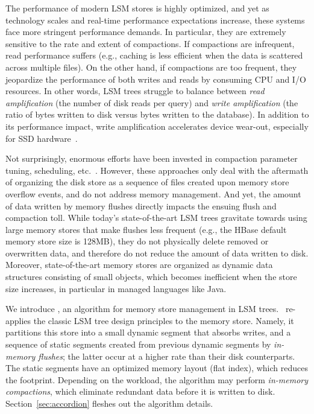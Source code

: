 The performance of modern LSM stores is highly optimized, and yet as technology scales and real-time 
performance expectations increase, these systems face more stringent performance demands. In particular, 
they are extremely sensitive to the rate and extent of compactions. If compactions are infrequent, read performance
suffers (e.g., caching is less efficient when the data is scattered across multiple files). On the other hand, if 
compactions are too frequent, they jeopardize the performance of both writes and reads by consuming CPU 
and I/O resources. In other words, LSM trees struggle to balance between {\em read amplification} (the number 
of disk reads per query) and {\em write amplification} (the ratio of bytes written to disk versus bytes written to the 
database). In addition to its performance impact, write amplification accelerates device wear-out, especially for SSD 
hardware~\cite{Hu:2009}. 

Not surprisingly, enormous efforts have been invested in compaction parameter tuning, scheduling, etc.~\cite{hbasetuning,
universalcompaction,scylladbcompaction,Sears:2012}. However, these approaches only deal with the aftermath
of organizing the disk store as a sequence of files created upon memory store overflow events, and do not 
address memory management. And yet, the amount of data written by memory flushes  
directly impacts the ensuing flush and compaction toll. 
While today's state-of-the-art LSM trees gravitate towards using large memory 
stores that make flushes less frequent (e.g., the HBase default memory store size is 128MB), 
they do not physically delete removed or overwritten data,
and therefore do not reduce the amount of data written to disk.
Moreover, state-of-the-art memory stores are organized as dynamic data structures consisting of small objects,
which becomes inefficient when the store size increases, in particular in managed languages like Java. 

We introduce \sys, an algorithm for memory store management in LSM trees. 
\sys\ re-applies the classic LSM tree design principles to the memory store. Namely, it partitions this store
 into a small dynamic segment that absorbs writes, and a sequence of static segments created 
 from previous dynamic segments by \emph{in-memory flushes}; the latter occur at a higher rate
 than their disk counterparts.  The static segments have an optimized memory
 layout (flat index), which reduces the footprint. Depending on the workload, the algorithm may 
 perform \emph{in-memory compactions}, which eliminate redundant %
 data before it is written to disk. Section~\ref{sec:accordion} fleshes out the algorithm details. 


